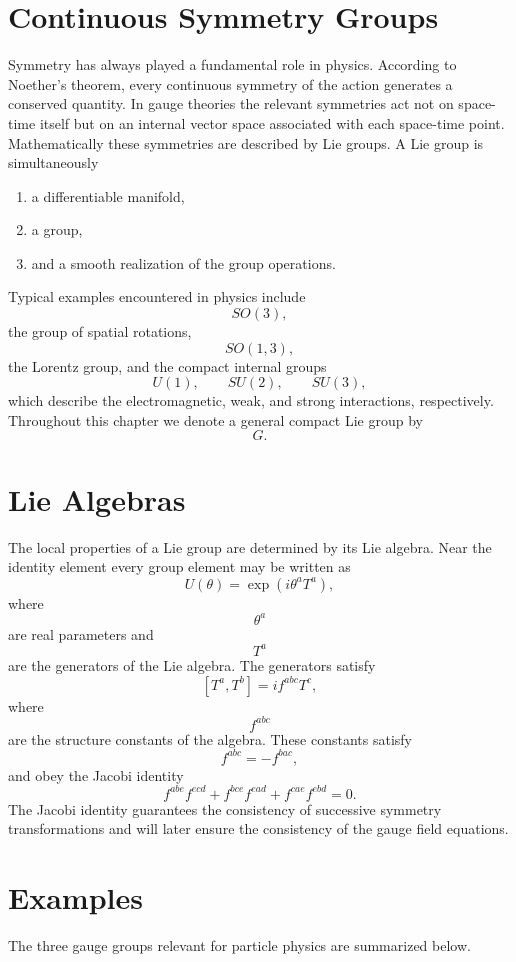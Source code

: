 \section{Continuous Symmetry Groups}
Symmetry has always played a fundamental role in physics. According to
Noether's theorem, every continuous symmetry of the action generates a
conserved quantity. In gauge theories the relevant symmetries act not on
space-time itself but on an internal vector space associated with each
space-time point.
Mathematically these symmetries are described by Lie groups.
A Lie group is simultaneously
\begin{enumerate}
\item a differentiable manifold,
\item a group,
\item and a smooth realization of the group operations.
\end{enumerate}
Typical examples encountered in physics include
\[SO(3),\]
the group of spatial rotations,
\[SO(1,3),\]
the Lorentz group,
and the compact internal groups
\[U(1),\qquad SU(2),\qquad SU(3),\]
which describe the electromagnetic, weak, and strong interactions,
respectively.
Throughout this chapter we denote a general compact Lie group by
\[G.\]
\section{Lie Algebras}
The local properties of a Lie group are determined by its Lie algebra.
Near the identity element every group element may be written as
\[\boxed{U(\theta)=\exp\left(i\theta^aT^a\right),}\]
where
\[\theta^a\]
are real parameters and
\[T^a\]
are the generators of the Lie algebra.
The generators satisfy
\[\boxed{[T^a,T^b]=if^{abc}T^c,}\]
where
\[f^{abc}\]
are the structure constants of the algebra.
These constants satisfy
\[f^{abc}=-f^{bac},\]
and obey the Jacobi identity
\[f^{abe}f^{ecd}+f^{bce}f^{ead}+f^{cae}f^{ebd}=0.\]
The Jacobi identity guarantees the consistency of successive symmetry
transformations and will later ensure the consistency of the gauge
field equations.
\section{Examples}
The three gauge groups relevant for particle physics are summarized
below.
